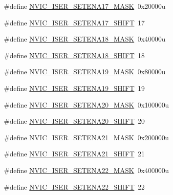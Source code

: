 \begin{DoxyCompactItemize}
\item 
\#define \hyperlink{group___n_v_i_c___register___masks_ga1f7c3725a157503cf3ab49cd37f3e9d7}{N\+V\+I\+C\+\_\+\+I\+S\+E\+R\+\_\+\+S\+E\+T\+E\+N\+A17\+\_\+\+M\+A\+SK}~0x20000u
\item 
\#define \hyperlink{group___n_v_i_c___register___masks_gabb84bd390a22aa1fbcf364b786d550c0}{N\+V\+I\+C\+\_\+\+I\+S\+E\+R\+\_\+\+S\+E\+T\+E\+N\+A17\+\_\+\+S\+H\+I\+FT}~17
\item 
\#define \hyperlink{group___n_v_i_c___register___masks_ga2234e183cc9a7671881356a207ed6d7e}{N\+V\+I\+C\+\_\+\+I\+S\+E\+R\+\_\+\+S\+E\+T\+E\+N\+A18\+\_\+\+M\+A\+SK}~0x40000u
\item 
\#define \hyperlink{group___n_v_i_c___register___masks_ga5a932aef5d95eec03c1cf6d1bd7b72ea}{N\+V\+I\+C\+\_\+\+I\+S\+E\+R\+\_\+\+S\+E\+T\+E\+N\+A18\+\_\+\+S\+H\+I\+FT}~18
\item 
\#define \hyperlink{group___n_v_i_c___register___masks_ga9128100d4382b53226675e81145dafdc}{N\+V\+I\+C\+\_\+\+I\+S\+E\+R\+\_\+\+S\+E\+T\+E\+N\+A19\+\_\+\+M\+A\+SK}~0x80000u
\item 
\#define \hyperlink{group___n_v_i_c___register___masks_gaaadbe8d9693d78557ed4251861789224}{N\+V\+I\+C\+\_\+\+I\+S\+E\+R\+\_\+\+S\+E\+T\+E\+N\+A19\+\_\+\+S\+H\+I\+FT}~19
\item 
\#define \hyperlink{group___n_v_i_c___register___masks_ga0ebec58d1531064b7175c3e56298613c}{N\+V\+I\+C\+\_\+\+I\+S\+E\+R\+\_\+\+S\+E\+T\+E\+N\+A20\+\_\+\+M\+A\+SK}~0x100000u
\item 
\#define \hyperlink{group___n_v_i_c___register___masks_gabb296e60c902c143c2b00c615fae9bdb}{N\+V\+I\+C\+\_\+\+I\+S\+E\+R\+\_\+\+S\+E\+T\+E\+N\+A20\+\_\+\+S\+H\+I\+FT}~20
\item 
\#define \hyperlink{group___n_v_i_c___register___masks_gaefdcd89f0095b4f9412445756eb196e6}{N\+V\+I\+C\+\_\+\+I\+S\+E\+R\+\_\+\+S\+E\+T\+E\+N\+A21\+\_\+\+M\+A\+SK}~0x200000u
\item 
\#define \hyperlink{group___n_v_i_c___register___masks_ga1c347c5bcfe46f144acb62466bd93542}{N\+V\+I\+C\+\_\+\+I\+S\+E\+R\+\_\+\+S\+E\+T\+E\+N\+A21\+\_\+\+S\+H\+I\+FT}~21
\item 
\#define \hyperlink{group___n_v_i_c___register___masks_ga542109bead7b2966da7dedbd5c3da058}{N\+V\+I\+C\+\_\+\+I\+S\+E\+R\+\_\+\+S\+E\+T\+E\+N\+A22\+\_\+\+M\+A\+SK}~0x400000u
\item 
\#define \hyperlink{group___n_v_i_c___register___masks_ga5911e8143eefe6136de13ee08eef8e0c}{N\+V\+I\+C\+\_\+\+I\+S\+E\+R\+\_\+\+S\+E\+T\+E\+N\+A22\+\_\+\+S\+H\+I\+FT}~22

\end{DoxyCompactItemize}
